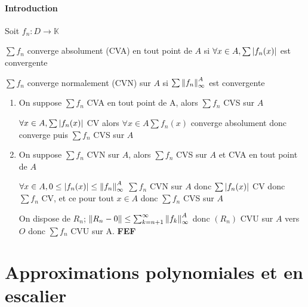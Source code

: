 \documentclass[11pt,hidelinks]{book}
\theoremstyle{mytheoremstyle}
\theoremstyle{mytheoremstyle}
\theoremstyle{mytheoremstyle}
\theoremstyle{mytheoremstyle}
\theoremstyle{mytheoremstyle}
\theoremstyle{mytheoremstyle}
\theoremstyle{mytheoremstyle}
\theoremstyle{mytheoremstyle}
\theoremstyle{myproblemstyle}
\def\mbb#1{\mathbb{#1}}
\def\bK{\mbb{K}}
\def\fef{\textbf{FEF}}
\newcommand{\func}[3]{#1\colon#2\to#3}
\begin{document}
\paragraph{Introduction} Soit $\func{f_n}{D}{\bK}$ 
\begin{definition}
    $\sum f_n$ converge absolument (CVA) en tout point de $A$ si $\forall x \in A, \sum \abs{f_n(x)}$ est convergente
\end{definition}
\begin{definition}
    $\sum f_n$ converge normalement (CVN) sur $A$ si $\sum \norm{f_n}^{A}_{\infty}$ est convergente
\end{definition}
\begin{adjustwidth}{-2em}{-1em}
    \begin{prop}
        \begin{enumerate}
        \item On suppose $\sum f_n$ CVA en tout point de A, alors $\sum f_n$ CVS sur $A$
        \begin{ef}
            $\forall x \in A, \sum \abs{f_n(x)}$ CV alors 
            $\forall x \in A \sum f_n(x)$ converge absolument donc converge 
            puis $\sum f_n$ CVS sur $A$
        \end{ef}
        \item On suppose $\sum f_n$ CVN sur $A$, alors $\sum f_n$ CVS sur $A$ et CVA en tout point de $A$
        \begin{ef}
            $\forall x \in A, 0 \leq \abs{f_n(x)} \leq \norm{f_n}^A_{\infty}$
            $\sum f_n$ CVN sur $A$ donc $\sum \abs{f_n(x)}$ CV donc $\sum f_n$ CV, et ce pour tout $x \in A$
            donc $\sum f_n$ CVS sur $A$ 

            On dispose de $R_n$; $\norm{R_n - 0} \leq \sum^{\infty}_{k=n+1} \norm{f_k}^{A}_{\infty}$
            donc $(R_n)$ CVU sur $A$ vers $O$ donc $\sum f_n$ CVU sur A. \fef
        \end{ef} 
    \end{enumerate}
    \end{prop}
\end{adjustwidth}
\section{Approximations polynomiales et en escalier}
\end{document}
